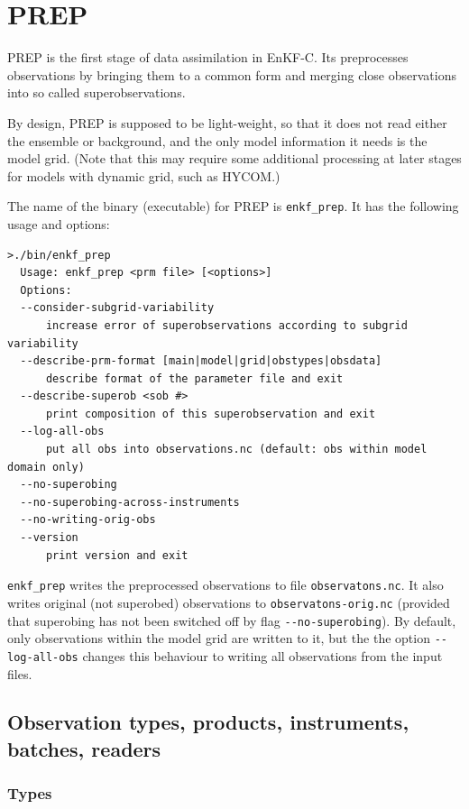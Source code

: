 \documentclass[11pt]{report}
\begin{document}
\section{PREP}

PREP is the first stage of data assimilation in EnKF-C.
Its preprocesses observations by bringing them to a common form and merging close observations into so called superobservations.

By design, PREP is supposed to be light-weight, so that it does not read either the ensemble or background, and the only model information it needs is the model grid. 
(Note that this may require some additional processing at later stages for models with dynamic grid, such as HYCOM.)

The name of the binary (executable) for PREP is \verb|enkf_prep|.
It has the following usage and options:
\begin{Verbatim}[frame=single,fontsize=\footnotesize]
>./bin/enkf_prep
  Usage: enkf_prep <prm file> [<options>]
  Options:
  --consider-subgrid-variability
      increase error of superobservations according to subgrid variability
  --describe-prm-format [main|model|grid|obstypes|obsdata]
      describe format of the parameter file and exit
  --describe-superob <sob #>
      print composition of this superobservation and exit
  --log-all-obs
      put all obs into observations.nc (default: obs within model domain only)
  --no-superobing
  --no-superobing-across-instruments
  --no-writing-orig-obs
  --version
      print version and exit
\end{Verbatim}

\verb|enkf_prep| writes the preprocessed observations to file \verb|observatons.nc|.
It also writes original (not superobed) observations to \verb|observatons-orig.nc| (provided that superobing has not been switched off by flag \verb|--no-superobing|).
By default, only observations within the model grid are written to it, but the the option \verb|--log-all-obs| changes this behaviour to writing all observations from the input files.

\subsection{Observation types, products, instruments, batches, readers}

\subsubsection{Types}
\label{sec:types}
\end{document}
